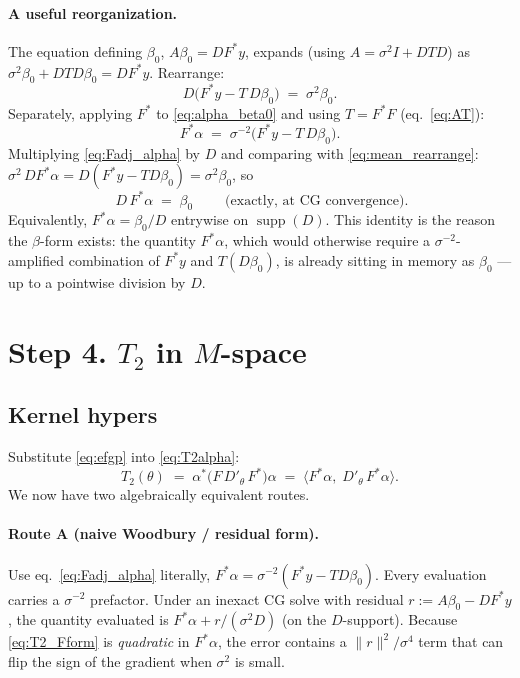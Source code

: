 \documentclass[11pt]{article}
\numberwithin{equation}{section}
\newcommand{\Amean}{A}
\begin{document}
\paragraph{A useful reorganization.} The equation defining $\beta_0$,
$\Amean\beta_0 = DF^*y$, expands (using $\Amean = \sigma^2 I + DTD$) as
$\sigma^2\beta_0 + DTD\beta_0 = DF^*y$. Rearrange:
\begin{equation}
  D\bigl(F^*y - T\,D\beta_0\bigr) \;=\; \sigma^2\beta_0.
  \label{eq:mean_rearrange}
\end{equation}
Separately, applying $F^*$ to \eqref{eq:alpha_beta0} and using $T = F^*F$
(eq.~\eqref{eq:AT}):
\begin{equation}
  F^*\alpha \;=\; \sigma^{-2}\bigl(F^*y - T\,D\beta_0\bigr).
  \label{eq:Fadj_alpha}
\end{equation}
Multiplying \eqref{eq:Fadj_alpha} by $D$ and comparing with
\eqref{eq:mean_rearrange}: $\sigma^2\,DF^*\alpha = D(F^*y - TD\beta_0) =
\sigma^2\beta_0$, so
\begin{equation}
  \boxed{\;D\,F^*\alpha \;=\; \beta_0\;}\qquad\text{(exactly, at CG convergence)}.
  \label{eq:key_mean}
\end{equation}
Equivalently, $F^*\alpha = \beta_0/D$ entrywise on $\operatorname{supp}(D)$.
This identity is the reason the $\beta$-form exists: the quantity $F^*\alpha$,
which would otherwise require a $\sigma^{-2}$-amplified combination of $F^*y$
and $T(D\beta_0)$, is already sitting in memory as $\beta_0$ --- up to a
pointwise division by $D$.

\section{Step 4. $T_2$ in $M$-space}

\subsection*{Kernel hypers}

Substitute \eqref{eq:efgp} into \eqref{eq:T2alpha}:
\begin{equation}
  T_2(\theta) \;=\; \alpha^*\bigl(F\,D'_\theta\,F^*\bigr)\alpha
              \;=\; \langle F^*\alpha,\; D'_\theta\,F^*\alpha\rangle.
  \label{eq:T2_Fform}
\end{equation}
We now have two algebraically equivalent routes.

\paragraph{Route A (naive Woodbury / residual form).} Use
eq.~\eqref{eq:Fadj_alpha} literally, $F^*\alpha = \sigma^{-2}(F^*y - TD\beta_0)$.
Every evaluation carries a $\sigma^{-2}$ prefactor. Under an inexact CG solve
with residual $r := \Amean\beta_0 - DF^*y$, the quantity evaluated is
$F^*\alpha + r/(\sigma^2 D)$ (on the $D$-support). Because
\eqref{eq:T2_Fform} is \emph{quadratic} in $F^*\alpha$, the error contains a
$\|r\|^2/\sigma^4$ term that can flip the sign of the gradient when $\sigma^2$
is small.
\end{document}
